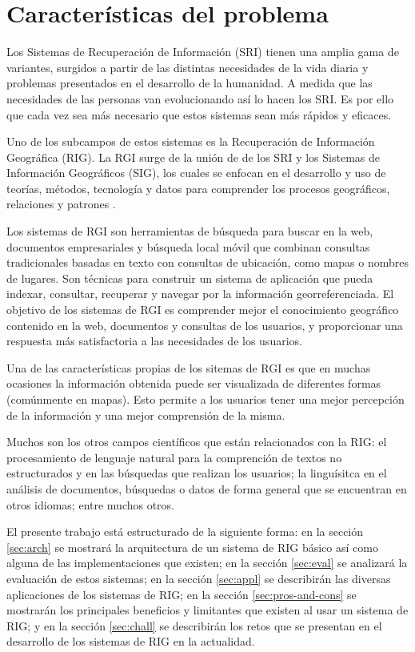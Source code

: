 \section{Características del problema}\label{sec:prob-charact}

Los Sistemas de Recuperación de Información (SRI) tienen una amplia gama de
variantes, surgidos a partir de las distintas necesidades de la vida diaria y
problemas presentados en el desarrollo de la humanidad. A medida que las
necesidades de las personas van evolucionando así lo hacen los SRI. Es por ello
que cada vez sea más necesario que estos sistemas sean más rápidos y eficaces.

Uno de los subcampos de estos sistemas es la Recuperación de Información
Geográfica (RIG). La RGI surge de la unión de de los SRI y los Sistemas de
Información Geográficos (SIG), los cuales se enfocan en el desarrollo y uso de
teorías, métodos, tecnología y datos para comprender los procesos geográficos,
relaciones y patrones \cite{chang2016}.

Los sistemas de RGI son herramientas de búsqueda para buscar en la web,
documentos empresariales y búsqueda local móvil que combinan consultas
tradicionales basadas en texto con consultas de ubicación, como mapas o nombres
de lugares. Son técnicas para construir un sistema de aplicación que pueda
indexar, consultar, recuperar y navegar por la información georreferenciada. El
objetivo de los sistemas de RGI es comprender mejor el conocimiento geográfico
contenido en la web, documentos y consultas de los usuarios, y proporcionar una
respuesta más satisfactoria a las necesidades de los usuarios.

Una de las características propias de los sitemas de RGI es que en muchas
ocasiones la información obtenida puede ser visualizada de diferentes formas
(comúnmente en mapas). Esto permite a los usuarios tener una mejor
percepción de la información y una mejor comprensión de la misma.

Muchos son los otros campos científicos que están relacionados con la RIG:
el procesamiento de lenguaje natural para la comprención de textos no
estructurados y en las búsquedas que realizan los usuarios; la linguísitca en
el análisis de documentos, búsquedas o datos de forma general que se encuentran
en otros idiomas; entre muchos otros.

El presente trabajo está estructurado de la siguiente forma: en la sección
\ref{sec:arch} se mostrará la arquitectura de un sistema de RIG básico así
como alguna de las implementaciones que existen; en la sección \ref{sec:eval} se
analizará la evaluación de estos sistemas; en la sección \ref{sec:appl} se
describirán las diversas aplicaciones de los sistemas de RIG; en la sección
\ref{sec:pros-and-cons} se mostrarán los principales beneficios y limitantes
que existen al usar un sistema de RIG; y en la sección \ref{sec:chall} se
describirán los retos que se presentan en el desarrollo de los sistemas de RIG
en la actualidad.

\newpage
